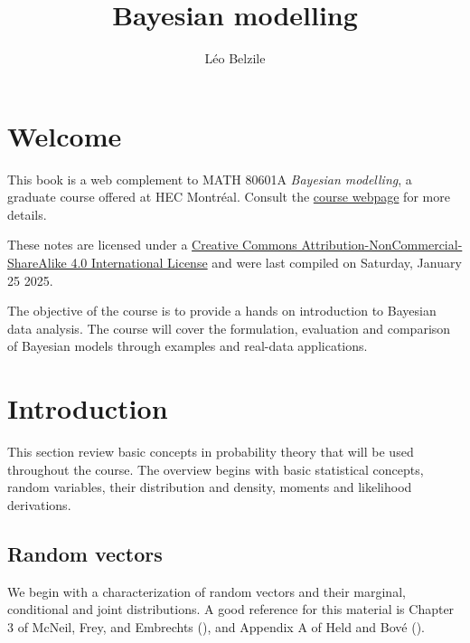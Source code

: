 \documentclass[
  11pt,
  letterpaper,
]{scrbook}
\title{Bayesian modelling}
\author{Léo Belzile}
\date{}
\renewcommand*\contentsname{Table of contents}
\newcommand\contentsname{Table of contents}
\theoremstyle{definition}
\theoremstyle{plain}
\theoremstyle{plain}
\theoremstyle{definition}
\theoremstyle{definition}
\theoremstyle{remark}
\begin{document}
\frontmatter
\maketitle

\renewcommand*\contentsname{Table of contents}
{
\setcounter{tocdepth}{2}
\tableofcontents
}

\mainmatter
{}

\chapter*{Welcome}\label{welcome}


This book is a web complement to MATH 80601A \emph{Bayesian modelling},
a graduate course offered at HEC Montréal. Consult the
\href{https://lbelzile.github.io/bayesmod}{course webpage} for more
details.

These notes are licensed under a
\href{http://creativecommons.org/licenses/by-nc-sa/4.0/}{Creative
Commons Attribution-NonCommercial-ShareAlike 4.0 International License}
and were last compiled on Saturday, January 25 2025.

The objective of the course is to provide a hands on introduction to
Bayesian data analysis. The course will cover the formulation,
evaluation and comparison of Bayesian models through examples and
real-data applications.


\chapter{Introduction}\label{introduction}

This section review basic concepts in probability theory that will be
used throughout the course. The overview begins with basic statistical
concepts, random variables, their distribution and density, moments and
likelihood derivations.

\section{Random vectors}\label{random-vectors}

We begin with a characterization of random vectors and their marginal,
conditional and joint distributions. A good reference for this material
is Chapter 3 of McNeil, Frey, and Embrechts
(), and Appendix A of
Held and Bové ().
\end{document}
